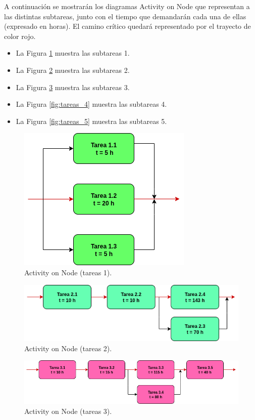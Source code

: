 \documentclass[
11pt, %
]{charter}
\begin{document}
A continuación se mostrarán los diagramas Activity on Node que representan a las distintas subtareas, junto con el tiempo que demandarán cada una de ellas (expresado en horas). El camino crítico quedará representado por el trayecto de color rojo.

\begin{itemize}
			\item La Figura \ref{fig:tareas_1} muestra las subtareas 1.
			\item La Figura \ref{fig:tareas_2} muestra las subtareas 2.
			\item La Figura \ref{fig:tareas_3} muestra las subtareas 3.
			\item La Figura \ref{fig:tareas_4} muestra las subtareas 4.
			\item La Figura \ref{fig:tareas_5} muestra las subtareas 5.
	\end{itemize}

\begin{figure}[H]
\centering
\includegraphics[scale=0.6]{./Figuras/tareas_1.png}
\caption{Activity on Node (tareas 1).}
\label{fig:tareas_1}
\end{figure}

\begin{figure}[H]
\centering
\includegraphics[scale=0.6]{./Figuras/tareas_2.png}
\caption{Activity on Node (tareas 2).}
\label{fig:tareas_2}
\end{figure}

\begin{figure}[H]
\centering
\includegraphics[scale=0.6]{./Figuras/tareas_3.png}
\caption{Activity on Node (tareas 3).}
\label{fig:tareas_3}
\end{figure}
\end{document}
